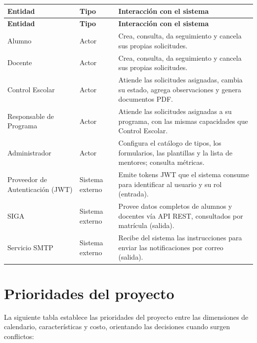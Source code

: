\documentclass[12pt,letterpaper]{report}
\begin{document}
\begin{longtable}{|L{4cm}|C{2.2cm}|L{7cm}|}
    \hline
    \textbf{Entidad} & \textbf{Tipo} & \textbf{Interacción con el sistema} \\
    \hline
    \endfirsthead
    \hline
    \textbf{Entidad} & \textbf{Tipo} & \textbf{Interacción con el sistema} \\
    \hline
    \endhead
    \hline
    \endfoot

    Alumno & Actor & Crea, consulta, da seguimiento y cancela sus propias solicitudes. \\
    \hline
    Docente & Actor & Crea, consulta, da seguimiento y cancela sus propias solicitudes. \\
    \hline
    Control Escolar & Actor & Atiende las solicitudes asignadas, cambia su estado, agrega observaciones y genera documentos PDF. \\
    \hline
    Responsable de Programa & Actor & Atiende las solicitudes asignadas a su programa, con las mismas capacidades que Control Escolar. \\
    \hline
    Administrador & Actor & Configura el catálogo de tipos, los formularios, las plantillas y la lista de mentores; consulta métricas. \\
    \hline
    Proveedor de Autenticación (JWT) & Sistema externo & Emite tokens JWT que el sistema consume para identificar al usuario y su rol (entrada). \\
    \hline
    SIGA & Sistema externo & Provee datos completos de alumnos y docentes vía API REST, consultados por matrícula (salida). \\
    \hline
    Servicio SMTP & Sistema externo & Recibe del sistema las instrucciones para enviar las notificaciones por correo (salida). \\
    \hline
\end{longtable}

\section{Prioridades del proyecto}

La siguiente tabla establece las prioridades del proyecto entre las dimensiones de calendario, características y costo, orientando las decisiones cuando surgen conflictos:
\end{document}
